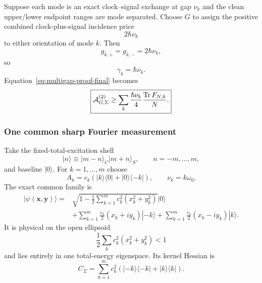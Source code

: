 Suppose each mode is an exact clock--signal exchange at gap $\nu_k$ and the clean upper/lower endpoint ranges are mode separated. Choose $G$ to assign the positive combined clock-plus-signal incidence price
\begin{equation}
2\hbar\nu_k
\end{equation}
to either orientation of mode $k$. Then
\begin{equation}
g_{k,+}=g_{k,-}=2\hbar\nu_k,
\end{equation}
so
\begin{equation}
\gamma_k=\hbar\nu_k.
\end{equation}
Equation~\eqref{eq:multigap-proof-final} becomes
\begin{equation}
\boxed{
\mathcal A_{G,\Sigma}^{(2)}
\ge
\sum_k\frac{\hbar\nu_k}{4}
\frac{\operatorname{Tr} F_{N,k}}{N}.
}
\label{eq:clean-multigap-proof-final}
\end{equation}

\subsubsection{One common sharp Fourier measurement}

Take the fixed-total-excitation shell
\begin{equation}
|n\rangle
\equiv|m-n\rangle_C|m+n\rangle_S,
\qquad n=-m,\ldots,m,
\end{equation}
and baseline $|0\rangle$. For $k=1,\ldots,m$ choose
\begin{equation}
A_k=c_k(|k\rangle\langle0|+|0\rangle\langle-k|),
\qquad
\nu_k=k\omega_0.
\end{equation}
The exact common family is
\begin{align}
|\psi(\bm x,\bm y)\rangle={}&
\sqrt{1-\frac12\sum_{k=1}^m c_k^2(x_k^2+y_k^2)}|0\rangle\\
&+\sum_{k=1}^m\frac{c_k}{2}(x_k+i y_k)|-k\rangle
+\sum_{k=1}^m\frac{c_k}{2}(x_k-i y_k)|k\rangle.
\end{align}
It is physical on the open ellipsoid
\begin{equation}
\frac12\sum_kc_k^2(x_k^2+y_k^2)<1
\end{equation}
and lies entirely in one total-energy eigenspace. Its kernel Hessian is
\begin{equation}
C_\Sigma
=\sum_{k=1}^m c_k^2
\left(|-k\rangle\langle-k|+|k\rangle\langle k|\right).
\end{equation}


